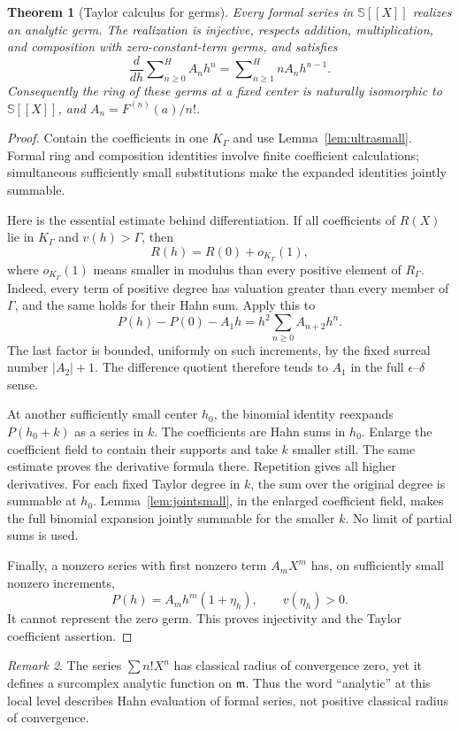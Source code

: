 \documentclass[11pt,a4paper]{article}
\newtheorem{theorem}{Theorem}[section]
\theoremstyle{definition}
\theoremstyle{remark}
\newtheorem{remark}[theorem]{Remark}
\newcommand{\SC}{\mathbb S}
\newcommand{\mm}{\mathfrak m}
\newcommand{\Hs}{\mathop{\sum}\nolimits^{\!H}}
\begin{document}
\begin{theorem}[Taylor calculus for germs]\label{thm:germcalculus}
Every formal series in $\SC[[X]]$ realizes an analytic germ. The
realization is injective, respects addition, multiplication, and
composition with zero-constant-term germs, and satisfies
\[
 \frac{d}{dh}\Hs_{n\ge0}A_nh^n
   =\Hs_{n\ge1}nA_nh^{n-1}.
\]
Consequently the ring of these germs at a fixed center is naturally
isomorphic to $\SC[[X]]$, and $A_n=F^{(n)}(a)/n!$.
\end{theorem}
\begin{proof}
Contain the coefficients in one $K_\Gamma$ and use
Lemma~\ref{lem:ultrasmall}. Formal ring and composition identities
involve finite coefficient calculations; simultaneous sufficiently
small substitutions make the expanded identities jointly summable.

Here is the essential estimate behind differentiation. If all
coefficients of $R(X)$ lie in $K_\Gamma$ and $v(h)>\Gamma$, then
\[
 R(h)=R(0)+o_{K_\Gamma}(1),
\]
where $o_{K_\Gamma}(1)$ means smaller in modulus than every positive
element of $R_\Gamma$. Indeed, every term of positive degree has
valuation greater than every member of $\Gamma$, and the same holds
for their Hahn sum. Apply this to
\[
 P(h)-P(0)-A_1h=h^2\sum_{n\ge0} A_{n+2}h^n.
\]
The last factor is bounded, uniformly on such increments, by the fixed
surreal number $|A_2|+1$. The difference quotient therefore tends to
$A_1$ in the full $\epsilon$--$\delta$ sense.

At another sufficiently small center $h_0$, the binomial identity
reexpands $P(h_0+k)$ as a series in $k$. The coefficients are
Hahn sums in $h_0$. Enlarge the coefficient field to contain their
supports and take $k$ smaller still. The same estimate proves the
derivative formula there. Repetition gives all higher derivatives.
For each fixed Taylor degree in $k$, the sum over the original
degree is summable at $h_0$. Lemma~\ref{lem:jointsmall}, in the
enlarged coefficient field, makes the full binomial expansion jointly
summable for the smaller $k$. No limit of partial sums is used.

Finally, a nonzero series with first nonzero term $A_mX^m$ has, on
sufficiently small nonzero increments,
\[
 P(h)=A_m h^m(1+\eta_h),\qquad v(\eta_h)>0.
\]
It cannot represent the zero germ. This proves injectivity and the
Taylor coefficient assertion.
\end{proof}

\begin{remark}
The series $\sum n!X^n$ has classical radius of convergence zero, yet
it defines a surcomplex analytic function on $\mm$. Thus the word
``analytic'' at this local level describes Hahn evaluation of formal
series, not positive classical radius of convergence.
\end{remark}
\end{document}
